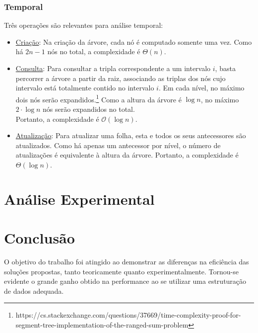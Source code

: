 \documentclass{article}
\begin{document}
\subsubsection{Temporal}
Três operações são relevantes para análise temporal:
\vspace{-5pt}
\begin{itemize}
  \item \uline{Criação}: Na criação da árvore, cada nó é computado somente uma vez. Como há $2n - 1$ nós no total, a complexidade é $\Theta(n)$.

  \item \uline{Consulta}: Para consultar a tripla correspondente a um intervalo $i$, basta percorrer a árvore a partir da raiz, associando as triplas dos nós cujo intervalo está totalmente contido no intervalo $i$. Em cada nível, no máximo dois nós serão expandidos.\footnote{\label{link2}https://cs.stackexchange.com/questions/37669/time-complexity-proof-for-segment-tree-implementation-of-the-ranged-sum-problem} Como a altura da árvore é $\log n$, no máximo $2 \cdot \log n$ nós serão expandidos no total. \\ Portanto, a complexidade é $\mathcal{O}(\log n)$.
  
  \item \uline{Atualização}: Para atualizar uma folha, esta e todos os seus antecessores são atualizados. Como há apenas um antecessor por nível, o número de atualizações é equivalente à altura da árvore. Portanto, a complexidade é $\Theta(\log n)$.
\end{itemize}


\section{Análise Experimental}


\section{Conclusão}
O objetivo do trabalho foi atingido ao demonstrar as diferenças na eficiência das soluções propostas, tanto teoricamente quanto experimentalmente. Tornou-se evidente o grande ganho obtido na performance ao se utilizar uma estruturação de dados adequada.
\end{document}
